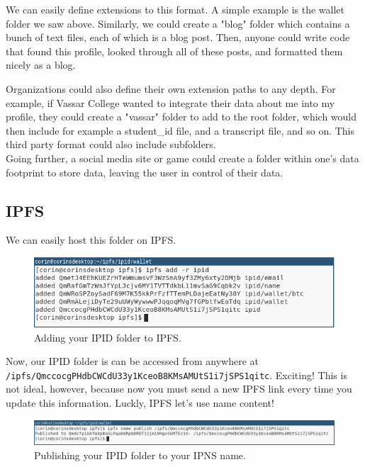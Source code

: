 \documentclass{article}
\begin{document}
We can easily define extensions to this format. A simple example is the wallet folder we saw above. Similarly, we could create a "blog" folder which contains a bunch of text files, each of which is a blog post. Then, anyone could write code that found this profile, looked through all of these posts, and formatted them nicely as a blog. \par
Organizations could also define their own extension paths to any depth. For example, if Vassar College wanted to integrate their data about me into my profile, they could create a "vassar" folder to add to the root folder, which would then include for example a student\_id file, and a transcript file, and so on. This third party format could also include subfolders. \\
Going further, a social media site or game could create a folder within one's data footprint to store data, leaving the user in control of their data. 

\subsection{IPFS}

We can easily host this folder on IPFS.

\begin{figure}[h]
  \centering
  \includegraphics[width=.9\textwidth]{resources/profile_to_ipfs.png}
  \caption{Adding your IPID folder to IPFS.}
\end{figure}

Now, our IPID folder is can be accessed from anywhere at \\
  \texttt{/ipfs/QmccocgPHdbCWCdU33y1KceoB8KMsAMUtS1i7jSPS1qitc}. Exciting! 
This is not ideal, however, because now you must send a new IPFS link every time you update this information. Luckly, IPFS let's use name content! 

\begin{figure}[h]
  \hspace*{-2cm}
  \centering
  \includegraphics[width=.75\paperwidth]{resources/publish_profile.png}
  \caption{Publishing your IPID folder to your IPNS name.}
\end{figure}
\end{document}
